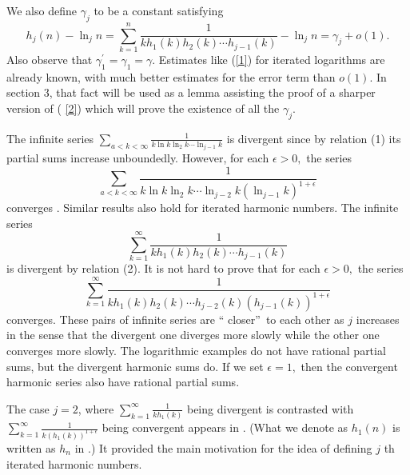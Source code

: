 \documentclass{article}
\theoremstyle{theorem}
\theoremstyle{definition}
\begin{document}
We also define $\gamma _{j}$ to be a constant satisfying 
\begin{equation}
h_{j}\left( n\right) -\ln _{j}n=\sum_{k=1}^{n}\frac{1}{kh_{1}\left(
k\right) h_{2}\left( k\right) \cdots h_{j-1}\left( k\right) }-\ln
_{j}n=\gamma _{j}+o\left( 1\right) .  \label{2}
\end{equation}%
Also observe that $\gamma _{1}^{\prime }=\gamma _{1}=\gamma .$ Estimates
like (\ref{1}) for iterated logarithms are already known, with much better
estimates for the error term than $o\left( 1\right) $. In section 3, that
fact will be used as a lemma assisting the proof of a sharper version of (%
\ref{2}) which will prove the existence of all the $\gamma _{j}$.

The infinite series $\sum_{a<k<\infty }\frac{1}{k\ln k\ln _{2}k\cdots \ln
_{j-1}k}$ is divergent since by relation (1) its partial sums increase
unboundedly. However, for each $\epsilon >0,$ the series 
\begin{equation*}
\sum_{a<k<\infty }\frac{1}{k\ln k\ln _{2}k\cdots \ln _{j-2}k\left(
\ln _{j-1}k\right) ^{1+\epsilon }}
\end{equation*}
converges \cite{A}. Similar results also hold for iterated harmonic
numbers. The infinite series 
\begin{equation*}
\sum_{k=1}^{\infty }\frac{1}{kh_{1}\left( k\right) h_{2}\left(
k\right) \cdots h_{j-1}\left( k\right) }
\end{equation*}%
is divergent by relation (2). It is not hard to prove that for each $%
\epsilon >0,$ the series 
\begin{equation*}
\sum_{k=1}^{\infty }\frac{1}{kh_{1}\left( k\right) h_{2}\left(
k\right) \cdots h_{j-2}\left( k\right) \left( h_{j-1}\left( k\right) \right)
^{1+\epsilon }}
\end{equation*}
converges. These pairs of infinite series are \textquotedblleft
closer\textquotedblright\ to each other as $j$ increases in the sense that
the divergent one diverges more slowly while the other one converges more
slowly. The logarithmic examples do not have rational partial sums, but the
divergent harmonic sums do. If we set $\epsilon =1,$ then the convergent
harmonic series also have rational partial sums.

The case $j=2$, where {\small $\sum_{k=1}^{\infty }\frac{1}{kh_{1}\left( k\right) }$}
being divergent is contrasted with {\small $\sum_{k=1}^{\infty }\frac{1}{k\left(
h_{1}\left( k\right) \right) ^{1+\epsilon }}$} being convergent appears in 
\cite{AP}. (What we denote as $h_{1}\left( n\right) $ is written as $h_{n}$
in \cite{AP}.) It provided the main motivation for the idea of defining $j$%
th iterated harmonic numbers.
\end{document}
